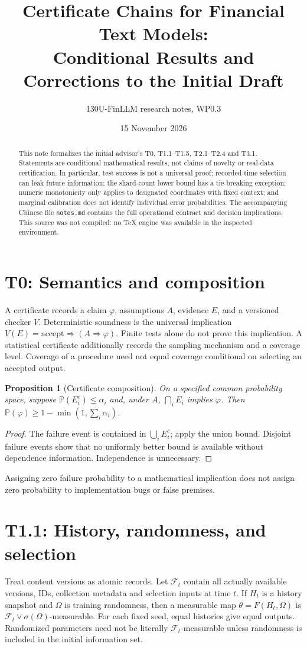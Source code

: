 \documentclass[11pt]{article}
\title{Certificate Chains for Financial Text Models:\\Conditional Results and Corrections to the Initial Draft}
\author{130U-FinLLM research notes, WP0.3}
\date{15 November 2026}
\newtheorem{proposition}{Proposition}
\newcommand{\Prob}{\mathbb P}
\begin{document}
\maketitle
\begin{abstract}
This note formalizes the initial advisor's T0, T1.1--T1.5,
T2.1--T2.4 and T3.1. Statements are conditional mathematical results,
not claims of novelty or real-data certification. In particular, test
success is not a universal proof; recorded-time selection can leak future
information; the shard-count lower bound has a tie-breaking exception;
numeric monotonicity only applies to designated coordinates with fixed
context; and marginal calibration does not identify individual error
probabilities. The accompanying Chinese file \texttt{notes.md} contains
the full operational contract and decision implications. This source was
not compiled: no TeX engine was available in the inspected environment.
\end{abstract}

\section{T0: Semantics and composition}
A certificate records a claim $\varphi$, assumptions $A$, evidence $E$,
and a versioned checker $V$. Deterministic soundness is the universal
implication $V(E)=\mathrm{accept}\Rightarrow(A\Rightarrow\varphi)$.
Finite tests alone do not prove this implication. A statistical
certificate additionally records the sampling mechanism and a coverage
level. Coverage of a procedure need not equal coverage conditional on
selecting an accepted output.
\begin{proposition}[Certificate composition]
On a specified common probability space, suppose
$\Prob(E_i^c)\le\alpha_i$ and, under $A$, $\bigcap_i E_i$ implies
$\varphi$. Then $\Prob(\varphi)\ge1-\min(1,\sum_i\alpha_i)$.
\end{proposition}
\begin{proof}
The failure event is contained in $\bigcup_i E_i^c$; apply the union
bound. Disjoint failure events show that no uniformly better bound is
available without dependence information. Independence is unnecessary.
\end{proof}
Assigning zero failure probability to a mathematical implication does
not assign zero probability to implementation bugs or false premises.

\section{T1.1: History, randomness, and selection}
Treat content versions as atomic records. Let $\mathcal F_t$ contain
all actually available versions, IDs, collection metadata and selection
inputs at time $t$. If $H_t$ is a history snapshot and $\Omega$ is
training randomness, then a measurable map
$\theta=F(H_t,\Omega)$ is
$\mathcal F_t\vee\sigma(\Omega)$-measurable. For each fixed seed,
equal histories give equal outputs. Randomized parameters need not be
literally $\mathcal F_t$-measurable unless randomness is included in the
initial information set.
\end{document}
